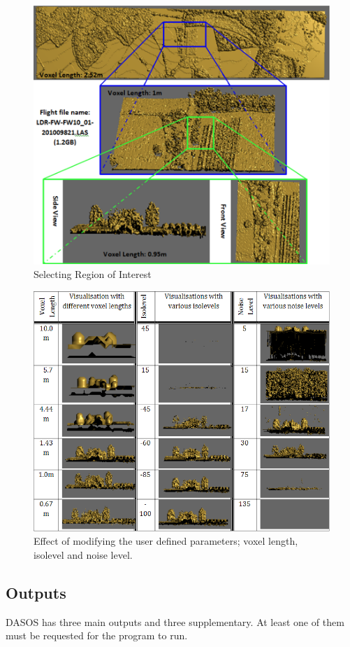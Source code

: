 \documentclass{article}
\begin{document}
			\begin{figure} [h!]
				\centering
				\includegraphics[width=.575\textwidth]{img/SelectingRegionOfInterest}
				\caption{Selecting Region of Interest}
				\label{fig:SelectingRegionOfInterest}
			\end{figure}			
			\begin{figure} [h!]
				\centering
				\includegraphics[width=.72\textwidth]{img/DASOS}
				\caption{Effect of modifying the user defined parameters; voxel length, isolevel and noise level.}
				\label{fig:DASOS}
			\end{figure}	
		
			
			\newpage
		
		\subsection{Outputs}\label{output}
		
		
			\par DASOS has three main outputs and three supplementary. At least one of them must be requested for the program to run. 
			
\end{document}

